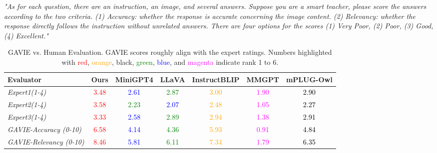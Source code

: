 \textit{"As for each question, there are an instruction, an image, and several answers. Suppose you are a smart teacher, please score the answers according to the two criteria. (1) Accuracy: whether the response is accurate concerning the image content. (2) Relevancy: whether the response directly follows the instruction without unrelated answers. There are four options for the scores (1) Very Poor, (2) Poor, (3) Good, (4) Excellent."}

\begin{table}[h]
\setlength\tabcolsep{3pt}
\centering
\small
\begin{tabular}{lcccccc}
\toprule[1.5pt]
Evaluator& Ours & MiniGPT4 & LLaVA & InstructBLIP & MMGPT & mPLUG-Owl\\
\midrule
\textit{Expert1(1-4)}& \textcolor{red}{3.48} & \textcolor{blue}{2.61} & \textcolor{green}{2.87} & \textcolor{orange}{3.00} & \textcolor{magenta}{1.90}&\textcolor{black}{2.90}\\
\textit{Expert2(1-4)} &\textcolor{red}{3.58}& \textcolor{green}{2.23}& \textcolor{blue}{2.07}& \textcolor{orange}{2.48}& \textcolor{magenta}{1.05}&\textcolor{black}{2.27}\\
\textit{Expert3(1-4)} & \textcolor{red}{3.33} & \textcolor{blue}{2.58} & \textcolor{green}{2.89} & \textcolor{orange}{2.94} & \textcolor{magenta}{1.38}&\textcolor{black}{2.91}\\
\midrule
\textit{GAVIE-Accuracy (0-10)} & \textcolor{red}{6.58} & \textcolor{blue}{4.14} & \textcolor{green}{4.36} & \textcolor{orange}{5.93} & \textcolor{magenta}{0.91}&\textcolor{black}{4.84}\\
\textit{GAVIE-Relevancy (0-10)}  & \textcolor{red}{8.46} & \textcolor{blue}{5.81} & \textcolor{green}{6.11} & \textcolor{orange}{7.34} & \textcolor{magenta}{1.79}&\textcolor{black}{6.35}\\
\bottomrule
\end{tabular}
\vspace{0.06in}
\caption{GAVIE vs. Human Evaluation. GAVIE scores roughly align with the expert ratings. Numbers highlighted with \textcolor{red}{red}, \textcolor{orange}{orange}, black, \textcolor{green}{green}, \textcolor{blue}{blue}, and \textcolor{magenta}{magenta} indicate rank 1 to 6.
}
\label{tab:appendix_human}
\vspace{-0.2in}
\end{table}

